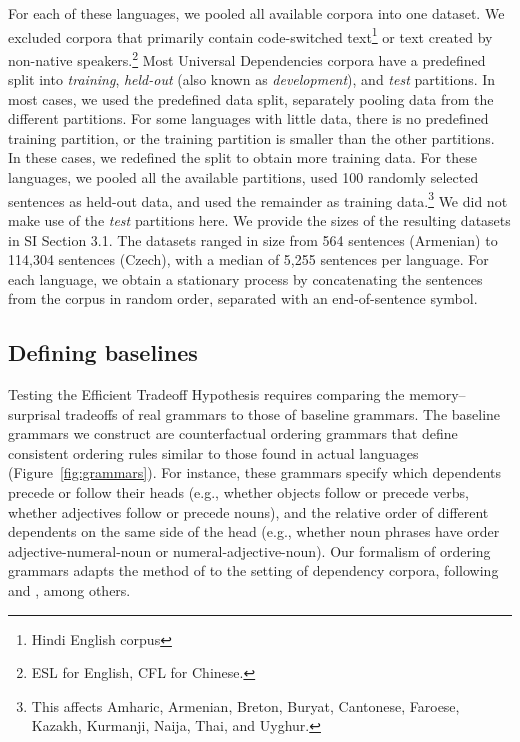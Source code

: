 For each of these languages, we pooled all available corpora into one dataset.
We excluded corpora that primarily contain code-switched text\footnote{Hindi English corpus} or text created by non-native speakers.\footnote{ESL for English, CFL for Chinese.}
Most Universal Dependencies corpora have a predefined split into \emph{training}, \emph{held-out} (also known as \emph{development}), and \emph{test} partitions.
In most cases, we used the predefined data split, separately pooling data from the different partitions. 
For some languages with little data, there is no predefined training partition, or the training partition is smaller than the other partitions.
In these cases, we redefined the split to obtain more training data.
For these languages, we pooled all the available partitions, used 100 randomly selected sentences as held-out data, and used the remainder as training data.\footnote{This affects Amharic, Armenian, Breton, Buryat, Cantonese, Faroese, Kazakh, Kurmanji, Naija, Thai, and Uyghur.}
We did not make use of the \textit{test} partitions here.
We provide the sizes of the resulting datasets in SI Section 3.1.
The datasets ranged in size from 564 sentences (Armenian) to 114,304 sentences (Czech), with a median of 5,255 sentences per language.
For each language, we obtain a stationary process by concatenating the sentences from the corpus in random order, separated with an end-of-sentence symbol.


\subsection{Defining baselines}

Testing the Efficient Tradeoff Hypothesis requires comparing the memory--surprisal tradeoffs of real grammars to those of baseline grammars. The baseline grammars we construct are counterfactual ordering grammars that define consistent ordering rules similar to those found in actual languages (Figure~\ref{fig:grammars}).
For instance, these grammars specify which dependents precede or follow their heads (e.g., whether objects follow or precede verbs, whether adjectives follow or precede nouns), and the relative order of different dependents on the same side of the head (e.g., whether noun phrases have order adjective-numeral-noun or numeral-adjective-noun). Our formalism of ordering grammars adapts the method of \citet{gildea-optimizing-2007,gildea-grammars-2010,gildea-human-2015} to the setting of dependency corpora, following \citet{futrell-large-scale-2015} and \citet{hahn2020universals}, among others.


